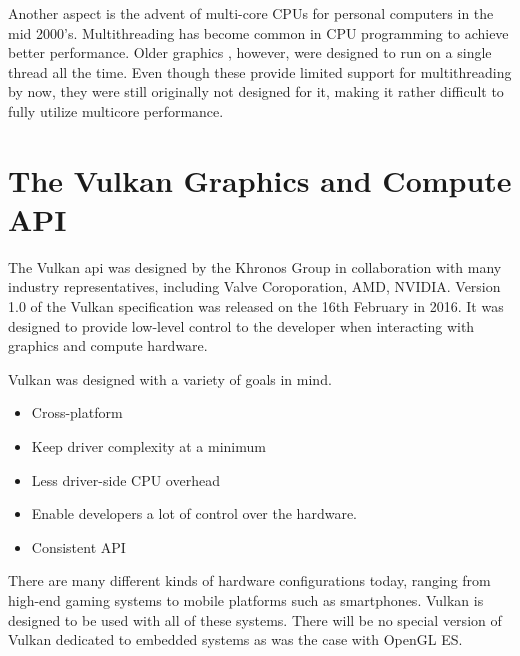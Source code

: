     Another aspect is the advent of multi-core CPUs for personal computers in the mid 2000's. Multithreading has become common in CPU programming to achieve better performance. Older graphics , however, were designed to run on a single thread all the time. Even though these  provide limited support for multithreading by now, they were still originally not designed for it, making it rather difficult to fully utilize multicore performance.



  \section{The Vulkan Graphics and Compute API}

    The Vulkan \acrfull{api} was designed by the Khronos Group in collaboration with many industry representatives, including Valve Coroporation, AMD, NVIDIA. Version 1.0 of the Vulkan specification was released on the 16th February in 2016. It was designed to provide low-level control to the developer when interacting with graphics and compute hardware.

    Vulkan was designed with a variety of goals in mind.

    \begin{itemize}
      \item Cross-platform
      \item Keep driver complexity at a minimum
      \item Less driver-side CPU overhead
      \item Enable developers a lot of control over the hardware.
      \item Consistent API
    \end{itemize}

    There are many different kinds of hardware configurations today, ranging from high-end gaming systems to mobile platforms such as smartphones. Vulkan is designed to be used with all of these systems. There will be no special version of Vulkan dedicated to embedded systems as was the case with OpenGL ES.

